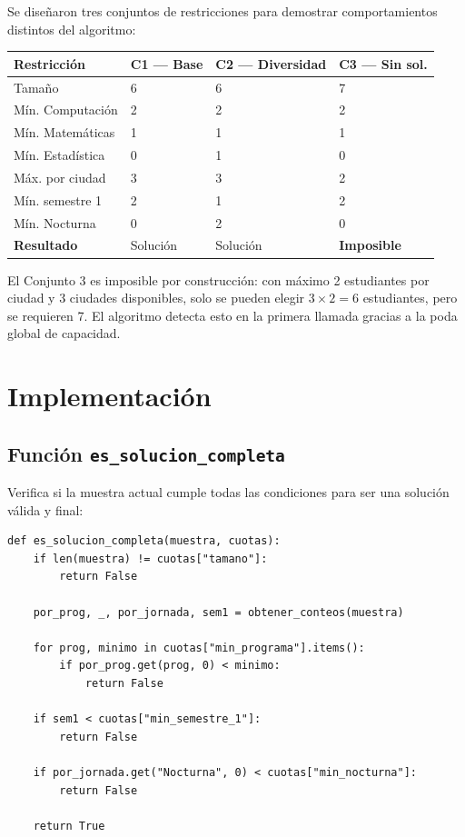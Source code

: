 \documentclass[12pt, a4paper]{article}
\begin{document}
Se diseñaron tres conjuntos de restricciones para demostrar comportamientos distintos del algoritmo:

\begin{center}
\begin{tabular}{p{3.2cm}p{3.2cm}p{3.2cm}p{3.2cm}}
  \toprule
  \textbf{Restricción} & \textbf{C1 — Base} & \textbf{C2 — Diversidad} & \textbf{C3 — Sin sol.} \\
  \midrule
  Tamaño               & 6   & 6   & 7 \\
  Mín. Computación     & 2   & 2   & 2 \\
  Mín. Matemáticas     & 1   & 1   & 1 \\
  Mín. Estadística     & 0   & 1   & 0 \\
  Máx. por ciudad      & 3   & 3   & 2 \\
  Mín. semestre 1      & 2   & 1   & 2 \\
  Mín. Nocturna        & 0   & 2   & 0 \\
  \midrule
  \textbf{Resultado}   & Solución & Solución & \textbf{Imposible} \\
  \bottomrule
\end{tabular}
\end{center}

El Conjunto 3 es imposible por construcción: con máximo 2 estudiantes por ciudad y 3 ciudades disponibles, solo se pueden elegir $3 \times 2 = 6$ estudiantes, pero se requieren 7. El algoritmo detecta esto en la primera llamada gracias a la poda global de capacidad.

\section{Implementación}
\label{sec:implementacion}

\subsection{Función \texttt{es\_solucion\_completa}}

Verifica si la muestra actual cumple todas las condiciones para ser una solución válida y final:

\begin{lstlisting}[style=python, caption={Condición de solución completa}]
def es_solucion_completa(muestra, cuotas):
    if len(muestra) != cuotas["tamano"]:
        return False

    por_prog, _, por_jornada, sem1 = obtener_conteos(muestra)

    for prog, minimo in cuotas["min_programa"].items():
        if por_prog.get(prog, 0) < minimo:
            return False

    if sem1 < cuotas["min_semestre_1"]:
        return False

    if por_jornada.get("Nocturna", 0) < cuotas["min_nocturna"]:
        return False

    return True
\end{lstlisting}
\end{document}
